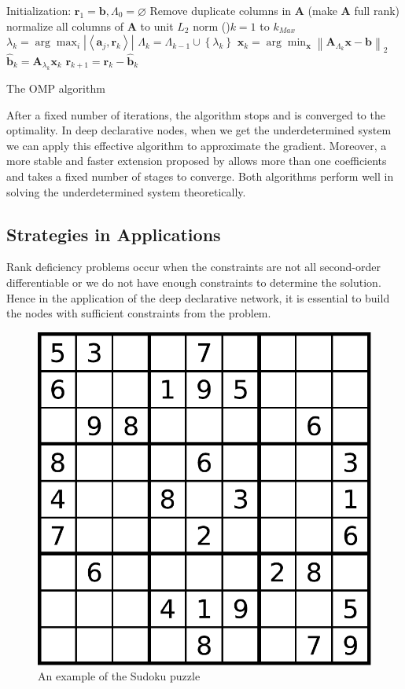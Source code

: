\begin{algorithm}[H]
    \SetAlgoLined
    Initialization: $\mathbf{r}_{1}=\mathbf{b}, \Lambda_{0}=\varnothing$\;
    Remove duplicate columns in $\mathbf{A}$ (make $\mathbf{A}$ full rank) \;
    normalize all columns of $\mathbf{A}$ to unit $L_2$ norm\;
    \For(){$k=1$ to $k_{Max}$}{
      $\lambda_{k}=\arg \max _{i}\left|\left\langle\mathbf{a}_{j}, \mathbf{r}_{k}\right\rangle\right|$\; 
      $\Lambda_{k}=\Lambda_{k-1} \cup\left\{\lambda_{k}\right\}$\;
      $\mathbf{x}_{k}=\arg \min _{\mathbf{x}}\left\|\mathbf{A}_{\Lambda_{k}} \mathbf{x}-\mathbf{b}\right\|_{2}$\; 
      $\hat{\mathbf{b}}_{k}=\mathbf{A}_{\lambda_{k}} \mathbf{x}_{k}$\; 
      $\mathbf{r}_{k+1}=\mathbf{r}_{k}-\hat{\mathbf{b}}_{k}$
    }
    \caption{The OMP algorithm}
\end{algorithm}
\par After a fixed number of iterations, the algorithm stops and is converged to the optimality. In deep declarative nodes, when we get the underdetermined system we can apply this effective algorithm to approximate the gradient. Moreover, a more stable and faster extension proposed by \cite{DD:58} allows more than one coefficients and takes a fixed number of stages to converge. Both algorithms perform well in solving the underdetermined system theoretically. 

\subsection{Strategies in Applications}
Rank deficiency problems occur when the constraints are not all second-order differentiable or we do not have enough constraints to determine the solution. Hence in the application of the deep declarative network, it is essential to build the nodes with sufficient constraints from the problem.
\begin{figure}[t]
    \label{fig:sudoku}
    \centering
    \includegraphics[page=1, width=.4\textwidth]{figs/sudoku.pdf}
    \caption{An example of the Sudoku puzzle~\citep{wiki:sudoku}}
\end{figure}

